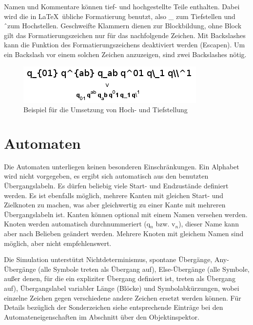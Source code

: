 Namen und Kommentare können tief- und hochgestellte Teile enthalten. Dabei wird die in \LaTeX \ übliche Formatierung benutzt, also \_ zum Tiefstellen und \^\  zum Hochstellen. Geschweifte Klammern dienen zur Blockbildung, ohne Block gilt das Formatierungszeichen nur für das nachfolgende Zeichen. Mit Backslashes kann die Funktion des Formatierungszeichens deaktiviert werden (Escapen). Um ein Backslash vor einem solchen Zeichen anzuzeigen, sind zwei Backslashes nötig.
\begin{figure}[!htbp]
\centering
\includegraphics[scale=0.7]{pic/parseString}%
\caption{Beispiel für die Umsetzung von Hoch- und Tiefstellung}%
\end{figure}
\section{Automaten}
Die Automaten unterliegen keinen besonderen Einschränkungen. Ein Alphabet wird nicht vorgegeben, es ergibt sich automatisch aus den benutzten Übergangslabeln. Es dürfen beliebig viele Start- und Endzustände definiert werden. Es ist ebenfalls möglich, mehrere Kanten mit gleichen Start- und Zielknoten zu machen, was aber gleichwertig zu einer Kante mit mehreren Übergangslabeln ist. Kanten können optional mit einem Namen versehen werden. Knoten werden automatisch durchnummeriert (q$_n$ bzw. v$_n$), dieser Name kann aber nach Belieben geändert werden. Mehrere Knoten mit gleichem Namen sind möglich, aber nicht empfehlenswert.

Die Simulation unterstützt Nichtdeterminismus, spontane Übergänge, Any-Über\-gänge (alle Symbole treten als Übergang auf), Else-Über\-gänge (alle Symbole, außer denen, für die ein expliziter Übergang definiert ist, treten als Übergang auf), Übergangslabel variabler Länge (Blöcke) und Symbolabkürzungen, wobei einzelne Zeichen gegen verschiedene andere Zeichen ersetzt werden können. Für Details bezüglich der Sonderzeichen siehe entsprechende Einträge bei den Automateneigenschaften im Abschnitt über den Objektinspektor.

